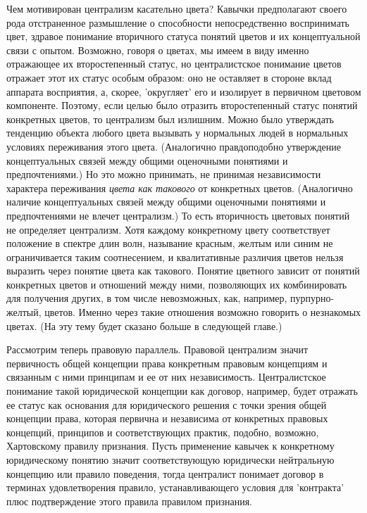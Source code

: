 \documentclass[11pt]{book}
\begin{document}
Чем мотивирован централизм касательно цвета? Кавычки предполагают своего рода отстраненное размышление о способности непосредственно воспринимать цвет, здравое понимание вторичного статуса понятий цветов и их концептуальной связи с опытом. Возможно, говоря о цветах, мы имеем в виду именно отражающее их второстепенный статус, но централистское понимание цветов отражает этот их статус особым образом: оно не оставляет в стороне вклад аппарата восприятия, а, скорее, 'округляет' его и изолирует в первичном цветовом компоненте. Поэтому, если целью было отразить второстепенный статус понятий конкретных цветов, то централизм был излишним. Можно было утверждать тенденцию объекта любого цвета вызывать у нормальных людей в нормальных условиях переживания этого цвета. (Аналогично правдоподобно утверждение концептуальных связей между общими оценочными понятиями и предпочтениями.) Но это можно принимать, не принимая независимости характера переживания \textit{цвета как такового} от конкретных цветов. (Аналогично наличие концептуальных связей между общими оценочными понятиями и предпочтениями не влечет централизм.) То есть вторичность цветовых понятий не определяет централизм. Хотя каждому конкретному цвету соответствует положение в спектре длин волн, называние красным, желтым или синим не ограничивается таким соотнесением, и квалитативные различия цветов нельзя выразить через понятие цвета как такового. Понятие цветного зависит от понятий конкретных цветов и отношений между ними, позволяющих их комбинировать для получения других, в том числе невозможных, как, например, пурпурно-желтый, цветов. Именно через такие отношения возможно говорить о незнакомых цветах. (На эту тему будет сказано больше в следующей главе.)

Рассмотрим теперь правовую параллель. Правовой централизм значит первичность общей концепции права конкретным правовым концепциям и связанным с ними принципам и ее от них независимость. Централистское понимание такой юридической концепции как договор, например, будет отражать ее статус как основания для юридического решения с точки зрения общей концепции права, которая первична и независима от конкретных правовых концепций, принципов и соответствующих практик, подобно, возможно, Хартовскому правилу признания. Пусть применение кавычек к конкретному юридическому понятию значит соответствующую юридически нейтральную концепцию или правило поведения, тогда централист понимает договор в терминах удовлетворения правило, устанавливающего условия для 'контракта' плюс подтверждение этого правила правилом признания.
\end{document}
